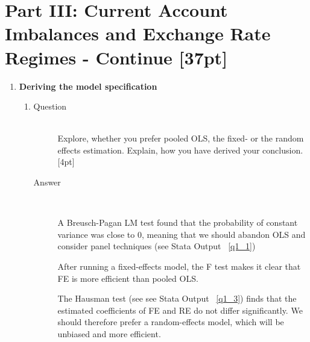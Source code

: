 \documentclass{article}
\begin{document}
\section{Part III: Current Account Imbalances and Exchange Rate Regimes - Continue [37pt]}

\begin{enumerate}
  \item \textbf{Deriving the model specification}
  \begin{enumerate}[label=(\alph*)]
    \item 
    \begin{description}
      \item[Question] \hfill \\
      Explore, whether you prefer pooled OLS, the fixed- or the random effects estimation. Explain, how you have derived your conclusion. [4pt]
      \item[Answer] \hfill \\
      \begin{figure}
      
      \end{figure}
      
      A Breusch-Pagan LM test found that the probability of constant variance was close to 0, meaning that we should abandon OLS and consider panel techniques (see Stata Output ~\ref{q1_1})
      
      \begin{figure}
      
      \end{figure}
      
      After running a fixed-effects model, the F test makes it clear that FE is more efficient than pooled OLS.
      
      \begin{figure}
      
      \end{figure}
      
      The Hausman test (see see Stata Output ~\ref{q1_3}) finds that the estimated coefficients of FE and RE do not differ significantly. We should therefore prefer a random-effects model, which will be unbiased and more efficient.
      

\end{description}
\end{enumerate}
\end{enumerate}
\end{document}
